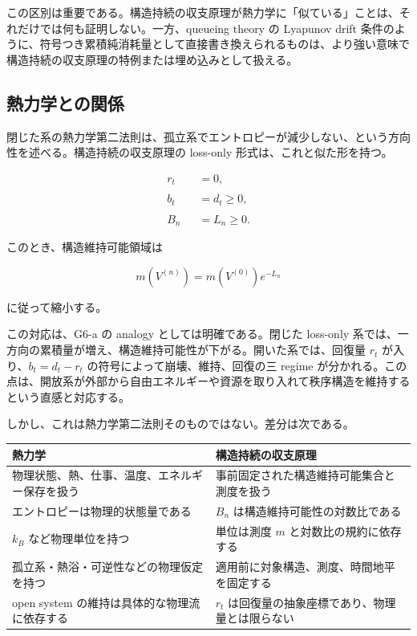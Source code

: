 \documentclass[12pt,a4paper]{article}
\begin{document}
この区別は重要である。構造持続の収支原理が熱力学に「似ている」ことは、それだけでは何も証明しない。一方、queueing theory の Lyapunov drift 条件のように、符号つき累積純消耗量として直接書き換えられるものは、より強い意味で構造持続の収支原理の特例または埋め込みとして扱える。

\subsection{熱力学との関係}\label{ux71b1ux529bux5b66ux3068ux306eux95a2ux4fc2}

閉じた系の熱力学第二法則は、孤立系でエントロピーが減少しない、という方向性を述べる。構造持続の収支原理の loss-only 形式は、これと似た形を持つ。

\[
\begin{aligned}
r_{t}&=0, \\
\qquad \\
b_{t}&=d_{t}\ge 0, \\
\qquad \\
B_{n}&=L_{n}\ge 0.
\end{aligned}
\]

このとき、構造維持可能領域は

\[
m(V^{(n)})=m(V^{(0)})e^{-L_{n}}
\]

に従って縮小する。

この対応は、G6-a の analogy としては明確である。閉じた loss-only 系では、一方向の累積量が増え、構造維持可能性が下がる。開いた系では、回復量 \(r_{t}\) が入り、\(b_{t}=d_{t}-r_{t}\) の符号によって崩壊、維持、回復の三 regime が分かれる。この点は、開放系が外部から自由エネルギーや資源を取り入れて秩序構造を維持するという直感と対応する。

しかし、これは熱力学第二法則そのものではない。差分は次である。

{\def\LTcaptype{table} %
\begin{longtable}[]{@{}
  >{\raggedright\arraybackslash}p{}
  >{\raggedright\arraybackslash}p{}@{}}
\toprule\noalign{}
\begin{minipage}[b]{\linewidth}\raggedright
熱力学
\end{minipage} & \begin{minipage}[b]{\linewidth}\raggedright
構造持続の収支原理
\end{minipage} \\
\midrule\noalign{}
\endhead
\bottomrule\noalign{}
\endlastfoot
物理状態、熱、仕事、温度、エネルギー保存を扱う & 事前固定された構造維持可能集合と測度を扱う \\
エントロピーは物理的状態量である & \(B_n\) は構造維持可能性の対数比である \\
\(k_B\) など物理単位を持つ & 単位は測度 \(m\) と対数比の規約に依存する \\
孤立系・熱浴・可逆性などの物理仮定を持つ & 適用前に対象構造、測度、時間地平を固定する \\
open system の維持は具体的な物理流に依存する & \(r_t\) は回復量の抽象座標であり、物理量とは限らない \\
\end{longtable}
}
\end{document}
